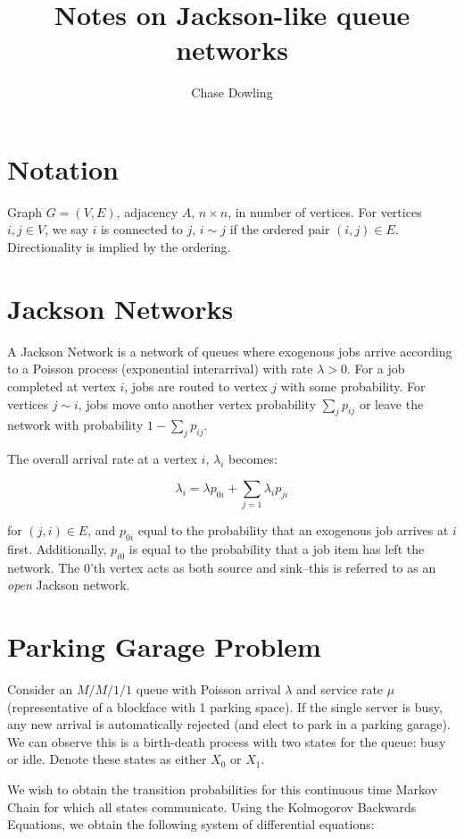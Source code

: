 \documentclass[]{article}
\title{Notes on Jackson-like queue networks}
\author{Chase Dowling}
\begin{document}
\maketitle

\section{Notation}

Graph $G = (V,E)$, adjacency $A$, $n \times n$, in number of vertices. For vertices $i,j \in V$, we say $i$ is connected to $j$, $i\sim j$ if the ordered pair $(i,j) \in E$. Directionality is implied by the ordering.

\section{Jackson Networks}

A Jackson Network is a network of queues where exogenous jobs arrive according to a Poisson process (exponential interarrival) with rate $\lambda > 0$.  For a job completed at vertex $i$, jobs are routed to vertex $j$ with some probability. For vertices $j\sim i$, jobs move onto another vertex probability $\sum_{j} p_{ij}$ or leave the network with probability $1 - \sum_{j} p_{ij}$. 

The overall arrival rate at a vertex $i$, $\lambda_i$ becomes:

\[\lambda_i = \lambda p_{0i} + \sum_{j=1} \lambda_i p_{ji}\]

for $(j,i) \in E$, and $p_{0i}$ equal to the probability that an exogenous job arrives at $i$ first. Additionally, $p_{i0}$ is equal to the probability that a job item has left the network. The 0'th vertex acts as both source and sink--this is referred to as an \emph{open} Jackson network.

\section{Parking Garage Problem}

Consider an $M/M/1/1$ queue with Poisson arrival $\lambda$ and service rate $\mu$ (representative of a blockface with 1 parking space). If the single server is busy, any new arrival is automatically rejected (and elect to park in a parking garage). We can observe this is a birth-death process with two states for the queue: busy or idle. Denote these states as either $X_0$ or $X_1$.

We wish to obtain the transition probabilities for this continuous time Markov Chain for which all states communicate. Using the Kolmogorov Backwards Equations, we obtain the following system of differential equations:
\end{document}
